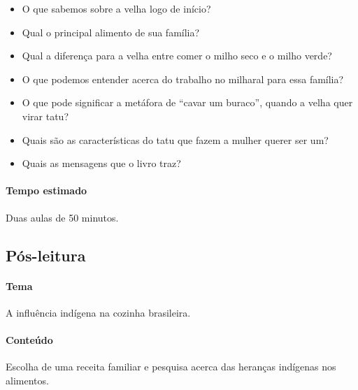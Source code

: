 \documentclass[11pt]{extarticle}
\begin{document}
\begin{itemize}

\item O que sabemos sobre a velha logo de início?

\item Qual o principal alimento de sua família?

\item Qual a diferença para a velha entre comer o milho seco e o milho verde?

\item O que podemos entender acerca do trabalho no milharal para essa família?

\item O que pode significar a metáfora de ``cavar um buraco'', quando a velha quer virar tatu?

\item Quais são as características do tatu que fazem a mulher querer ser um?

\item Quais as mensagens que o livro traz?

\end{itemize}


\paragraph{Tempo estimado} Duas aulas de 50 minutos.

\subsection{Pós-leitura}


\paragraph{Tema} A influência indígena na cozinha brasileira.

\paragraph{Conteúdo} Escolha de uma receita familiar e pesquisa acerca das heranças indígenas nos alimentos.
\end{document}
